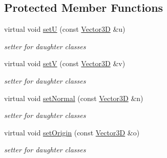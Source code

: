 \subsection*{Protected Member Functions}
\begin{DoxyCompactItemize}
\item 
virtual void \hyperlink{class_d_d4hep_1_1_d_d_rec_1_1_vol_surface_base_a8a39b98345cf8bb2ea7912b3974552e9}{setU} (const \hyperlink{class_d_d_surfaces_1_1_vector3_d}{Vector3D} \&u)
\begin{DoxyCompactList}\small\item\em setter for daughter classes \item\end{DoxyCompactList}\item 
virtual void \hyperlink{class_d_d4hep_1_1_d_d_rec_1_1_vol_surface_base_a032025d40e5fee926713517ae36f5d4b}{setV} (const \hyperlink{class_d_d_surfaces_1_1_vector3_d}{Vector3D} \&v)
\begin{DoxyCompactList}\small\item\em setter for daughter classes \item\end{DoxyCompactList}\item 
virtual void \hyperlink{class_d_d4hep_1_1_d_d_rec_1_1_vol_surface_base_a1ccc4ac2bd7ff9293b01798844d243e1}{setNormal} (const \hyperlink{class_d_d_surfaces_1_1_vector3_d}{Vector3D} \&n)
\begin{DoxyCompactList}\small\item\em setter for daughter classes \item\end{DoxyCompactList}\item 
virtual void \hyperlink{class_d_d4hep_1_1_d_d_rec_1_1_vol_surface_base_a3dc33b9f3661403fbeeaeb787e71d247}{setOrigin} (const \hyperlink{class_d_d_surfaces_1_1_vector3_d}{Vector3D} \&o)
\begin{DoxyCompactList}\small\item\em setter for daughter classes \item\end{DoxyCompactList}\end{DoxyCompactItemize}
